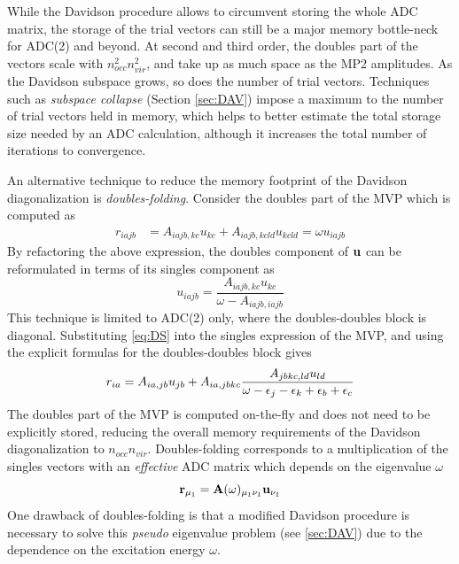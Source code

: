 While the Davidson procedure allows to circumvent storing the whole ADC matrix, the storage of the trial vectors can still be a major memory bottle-neck for ADC(2) and beyond. At second and third order, the doubles part of the vectors scale with $n_{occ}^2n_{vir}^2$, and take up as much space as the MP2 amplitudes. As the Davidson subspace grows, so does the number of trial vectors. Techniques such as \emph{subspace collapse} (Section \ref{sec:DAV}) impose a maximum to the number of trial vectors held in memory, which helps to better estimate the total storage size needed by an ADC calculation, although it increases the total number of iterations to convergence.

An alternative technique to reduce the memory footprint of the Davidson diagonalization is \emph{doubles-folding}. Consider the doubles part of the MVP which is computed as
\begin{align}
r_{iajb} &= A_{iajb,kc} u_{kc} + A_{iajb,kcld} u_{kcld} = \omega u_{iajb}
\end{align}
\noindent By refactoring the above expression, the doubles component of $\mathbf{u}$ can be reformulated in terms of its singles component as
\begin{equation}
u_{iajb} = \frac{A_{iajb,kc} u_{kc}}{\omega - A_{iajb,iajb}} 
\label{eq:DS}
\end{equation}
\noindent This technique is limited to ADC(2) only, where the doubles-doubles block is diagonal. Substituting \ref{eq:DS} into the singles expression of the MVP, and using the explicit formulas for the doubles-doubles block gives
\begin{equation}
r_{ia} = A_{ia,jb} u_{jb} + A_{ia,jbkc} \frac{A_{jbkc,ld} u_{ld}}{\omega - \epsilon_j - \epsilon_k + \epsilon_b + \epsilon_c} 
\end{equation}
\noindent The doubles part of the MVP is computed on-the-fly and does not need to be explicitly stored, reducing the overall memory requirements of the Davidson diagonalization to $n_{occ}n_{vir}$. Doubles-folding corresponds to a multiplication of the singles vectors with an \emph{effective} ADC matrix which depends on the eigenvalue $\omega$
\begin{equation}
\mathbf{r}_{\mu_1} = \mathbf{A}(\omega)_{\mu_1\nu_1} \mathbf{u}_{\nu_1} 
\end{equation}
\noindent One drawback of doubles-folding is that a modified Davidson procedure is necessary to solve this \emph{pseudo} eigenvalue problem (see \ref{sec:DAV}) due to the dependence on the excitation energy $\omega$.

